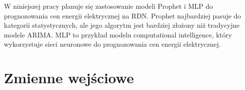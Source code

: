 W niniejszej pracy planuje się zastosowanie modeli Prophet i MLP do prognozowania cen energii elektrycznej na RDN. Prophet najbardziej pasuje do kategorii statystycznych, ale jego algorytm jest bardziej złożony niż tradycyjne modele ARIMA. MLP to przykład modelu computational intelligence, który wykorzystuje sieci neuronowe do prognozowania cen energii elektrycznej.

\section{Zmienne wejściowe}
\label{sec:zmienne_wejsciowe_literatura}





